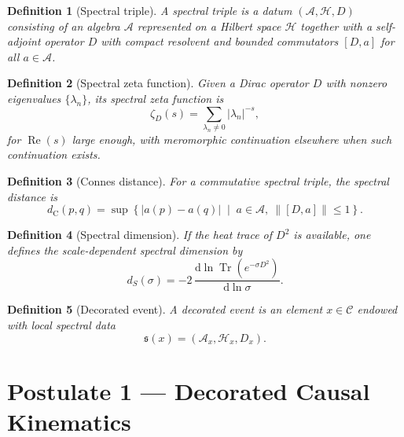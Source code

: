 \documentclass[12pt,a4paper]{article}
\theoremstyle{postulate}
\newtheorem{definition}{Definition}[section]
\newcommand{\Tr}{\operatorname{Tr}}
\newcommand{\Hil}{\mathcal{H}}
\newcommand{\Alg}{\mathcal{A}}
\newcommand{\Dirac}{D}
\newcommand{\dd}{\mathrm{d}}
\newcommand{\Causal}{\mathcal{C}}
\newcommand{\zetaD}{\zeta_D}
\begin{document}
\begin{definition}[Spectral triple]
A spectral triple is a datum $(\Alg,\Hil,\Dirac)$ consisting of an algebra
$\Alg$ represented on a Hilbert space $\Hil$ together with a self-adjoint
operator $\Dirac$ with compact resolvent and bounded commutators
$[\Dirac,a]$ for all $a\in\Alg$.
\end{definition}

\begin{definition}[Spectral zeta function]
Given a Dirac operator $\Dirac$ with nonzero eigenvalues $\{\lambda_n\}$, its
spectral zeta function is
\begin{equation}
  \zetaD(s) = \sum_{\lambda_n\neq 0} |\lambda_n|^{-s},
  \label{eq:zeta}
\end{equation}
for $\operatorname{Re}(s)$ large enough, with meromorphic continuation
elsewhere when such continuation exists.
\end{definition}

\begin{definition}[Connes distance]
For a commutative spectral triple, the spectral distance is
\begin{equation}
  d_{\mathrm C}(p,q)
  = \sup\left\{
      |a(p)-a(q)|
      \;\middle|\;
      a\in\Alg,\ \|[\Dirac,a]\|\leq 1
    \right\}.
  \label{eq:connes-distance}
\end{equation}
\end{definition}

\begin{definition}[Spectral dimension]
If the heat trace of $\Dirac^2$ is available, one defines the scale-dependent
spectral dimension by
\begin{equation}
  d_S(\sigma)
  = -2\,\frac{\dd \ln \Tr(e^{-\sigma \Dirac^2})}{\dd \ln \sigma}.
  \label{eq:spectral-dimension}
\end{equation}
\end{definition}

\begin{definition}[Decorated event]
A decorated event is an element $x\in\Causal$ endowed with local spectral
data
\begin{equation}
  \mathfrak{s}(x) = (\Alg_x,\Hil_x,\Dirac_x).
  \label{eq:decorated-event}
\end{equation}
\end{definition}

\section{Postulate 1 --- Decorated Causal Kinematics}
\label{sec:postulate}
\end{document}
